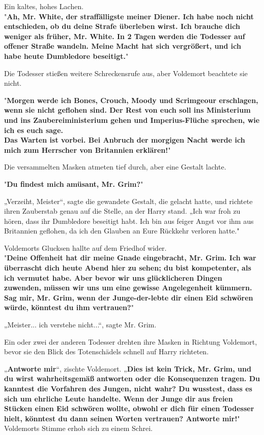 {Ein kaltes, hohes Lachen.\\ "\textbf{Ah, Mr. White, der straffälligste meiner Diener. Ich habe noch nicht entschieden, ob du deine Strafe überleben wirst. Ich brauche dich weniger als früher, Mr. White. In 2 Tagen werden die Todesser auf offener Straße wandeln. Meine Macht hat sich vergrößert, und ich habe heute Dumbledore beseitigt.}"

Die Todesser stießen weitere Schreckensrufe aus, aber Voldemort beachtete sie nicht.

"\textbf{Morgen werde ich Bones, Crouch, Moody und Scrimgeour erschlagen, wenn sie nicht geflohen sind. Der Rest von euch soll ins Ministerium und ins Zaubereiministerium gehen und Imperius-Flüche sprechen, wie ich es euch sage.\\ Das Warten ist vorbei. Bei Anbruch der morgigen Nacht werde ich mich zum Herrscher von Britannien erklären!}"

Die versammelten Masken atmeten tief durch, aber eine Gestalt lachte.

"\textbf{Du findest mich amüsant, Mr. Grim?}"

„Verzeiht, Meister“, sagte die gewandete Gestalt, die gelacht hatte, und richtete ihren Zauberstab genau auf die Stelle, an der Harry stand. „Ich war froh zu hören, dass ihr Dumbledore beseitigt habt. Ich bin aus feiger Angst vor ihm aus Britannien geflohen, da ich den Glauben an Eure Rückkehr verloren hatte."

Voldemorts Glucksen hallte auf dem Friedhof wider.\\ "\textbf{Deine Offenheit hat dir meine Gnade eingebracht, Mr. Grim. Ich war überrascht dich heute Abend hier zu sehen; du bist kompetenter, als ich vermutet habe. Aber bevor wir uns glücklicheren Dingen zuwenden, müssen wir uns um eine gewisse Angelegenheit kümmern. Sag mir, Mr. Grim, wenn der Junge-der-lebte dir einen Eid schwören würde, könntest du ihm vertrauen?}"

„Meister... ich verstehe nicht...“, sagte Mr. Grim.

Ein oder zwei der anderen Todesser drehten ihre Masken in Richtung Voldemort, bevor sie den Blick des Totenschädels schnell auf Harry richteten.

„\textbf{Antworte mir}“, zischte Voldemort. „\textbf{Dies ist kein Trick, Mr. Grim, und du wirst wahrheitsgemäß antworten oder die Konsequenzen tragen. Du kanntest die Vorfahren des Jungen, nicht wahr? Du wusstest, dass es sich um ehrliche Leute handelte. Wenn der Junge dir aus freien Stücken einen Eid schwören wollte, obwohl er dich für einen Todesser hielt, könntest du dann seinen Worten vertrauen? Antworte mir!}"\\ Voldemorts Stimme erhob sich zu einem Schrei.

}
